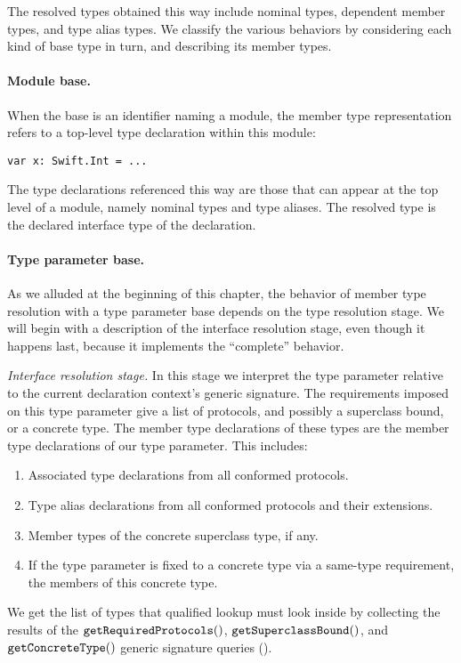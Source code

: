 \documentclass[../generics]{subfiles}
\begin{document}
The resolved types obtained this way include nominal types, dependent member types, and type alias types. We classify the various behaviors by considering each kind of base type in turn, and describing its member types.

\paragraph{Module base.}
When the base is an identifier naming a module, the member type representation refers to a top-level type declaration within this module:
\begin{Verbatim}
var x: Swift.Int = ...
\end{Verbatim}
The type declarations referenced this way are those that can appear at the top level of a module, namely nominal types and type aliases. The resolved type is the declared interface type of the declaration.

\paragraph{Type parameter base.}
As we alluded at the beginning of this chapter, the behavior of member type resolution with a type parameter base depends on the type resolution stage. We will begin with a description of the interface resolution stage, even though it happens last, because it implements the ``complete'' behavior.

\smallskip

\emph{Interface resolution stage.} In this stage we interpret the type parameter relative to the current declaration context's generic signature. The requirements imposed on this type parameter give a list of protocols, and possibly a superclass bound, or a concrete type. The member type declarations of these types are the member type declarations of our type parameter. This includes:
\begin{enumerate}
\item Associated type declarations from all conformed protocols.
\item Type alias declarations from all conformed protocols and their extensions.
\item Member types of the concrete superclass type, if any.
\item If the type parameter is fixed to a concrete type via a same-type requirement, the members of this concrete type.
\end{enumerate}
We get the list of types that qualified lookup must look inside by collecting the results of the $\texttt{getRequiredProtocols}()$, $\texttt{getSuperclassBound}()$, and $\texttt{getConcreteType}()$ generic signature queries ().
\end{document}
